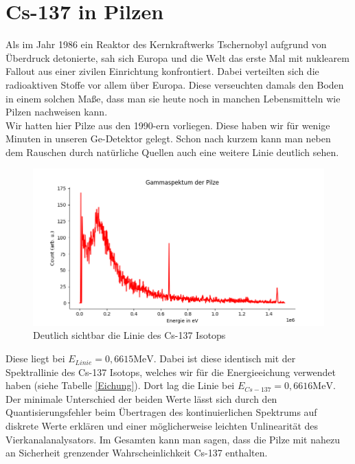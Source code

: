 \section{Cs-137 in Pilzen}

Als im Jahr 1986 ein Reaktor des Kernkraftwerks Tschernobyl aufgrund von Überdruck detonierte, sah sich Europa und die Welt das erste Mal mit 
nuklearem Fallout aus einer zivilen Einrichtung konfrontiert. Dabei verteilten sich die radioaktiven Stoffe vor allem über Europa. Diese verseuchten 
damals den Boden in einem solchen Maße, dass man sie heute noch in manchen Lebensmitteln wie Pilzen nachweisen kann.\\
Wir hatten hier Pilze aus den 1990-ern vorliegen. Diese haben wir für wenige Minuten in unseren Ge-Detektor gelegt. Schon nach kurzem kann man 
neben dem Rauschen durch natürliche Quellen auch eine weitere Linie deutlich sehen.

\begin{figure}[ht]
    \centering
    \includegraphics[width = 12cm]{Bilder/Auswertung/Pilze.png}
    \caption{Deutlich sichtbar die Linie des Cs-137 Isotops}
\end{figure}

Diese liegt bei $E_{Linie} =0,6615 \mathrm{MeV}$. Dabei ist diese identisch mit der Spektrallinie des Cs-137 Isotops, welches wir für die 
Energieeichung verwendet haben (siehe Tabelle \ref{Eichung}). Dort lag die Linie bei $E_{Cs-137} = 0,6616 \mathrm{MeV}$.\\
Der minimale Unterschied der beiden Werte lässt sich durch den 
Quantisierungsfehler beim Übertragen des kontinuierlichen Spektrums auf diskrete Werte erklären und einer möglicherweise leichten Unlinearität des Vierkanalanalysators.
Im Gesamten kann man sagen, dass die Pilze mit nahezu an Sicherheit grenzender Wahrscheinlichkeit Cs-137 enthalten.